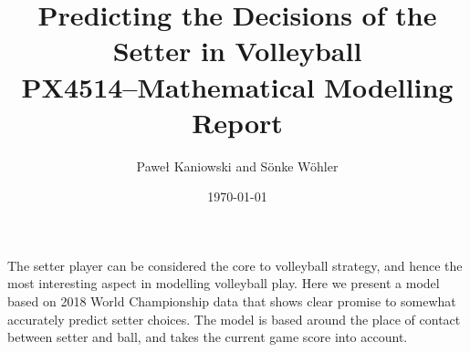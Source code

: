 \documentclass[11pt]{article}
\title{   Predicting the Decisions of the Setter in Volleyball \\
  \large PX4514--Mathematical Modelling Report
}
\author{Pawe{\l} Kaniowski and S\"onke W\"ohler}
\date{\today}
\begin{document}
  
  

  \clearpage
  
  \abstract
    \begingroup
      \fontsize{8pt}{10pt}\selectfont
        
        The setter player can be considered the core to volleyball strategy, and hence the most interesting aspect in modelling volleyball play. Here we present a model based on 2018 World Championship data that shows clear promise to somewhat accurately predict setter choices. The model is based around the place of contact between setter and ball, and takes the current game score into account.
    
    \endgroup
    \hrulefill
    
      
      
      
      
    
    \scriptsize
    
  
\end{document}
